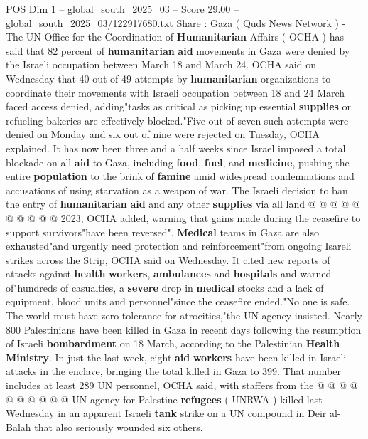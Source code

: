 \begin{textsample}{POS Dim 1 – global\_south\_2025\_03 – Score 29.00 – global\_south\_2025\_03/122917680.txt}  \label{ex:f1_pos_262}
Share : Gaza ( Quds News Network ) - The UN Office for the Coordination of \textbf{Humanitarian} Affairs ( OCHA ) has said that 82 percent of \textbf{humanitarian} \textbf{aid} movements in Gaza were denied by the Israeli occupation between March 18 and March 24.
OCHA said on Wednesday that 40 out of 49 attempts by \textbf{humanitarian} organizations to coordinate their movements with Israeli occupation between 18 and 24 March faced access denied, adding"tasks as critical as picking up essential \textbf{supplies} or refueling bakeries are effectively blocked."Five out of seven such attempts were denied on Monday and six out of nine were rejected on Tuesday, OCHA explained.
It has now been three and a half weeks since Israel imposed a total blockade on all \textbf{aid} to Gaza, including \textbf{food}, \textbf{fuel}, and \textbf{medicine}, pushing the entire \textbf{population} to the brink of \textbf{famine} amid widespread condemnations and accusations of using starvation as a weapon of war.
The Israeli decision to ban the entry of \textbf{humanitarian} \textbf{aid} and any other \textbf{supplies} via all land @ @ @ @ @ @ @ @ @ @ 2023, OCHA added, warning that gains made during the ceasefire to support survivors"have been reversed". \textbf{Medical} teams in Gaza are also exhausted"and urgently need protection and reinforcement"from ongoing Isareli strikes across the Strip, OCHA said on Wednesday.
It cited new reports of attacks against \textbf{health} \textbf{workers}, \textbf{ambulances} and \textbf{hospitals} and warned of"hundreds of casualties, a \textbf{severe} drop in \textbf{medical} stocks and a lack of equipment, blood units and personnel"since the ceasefire ended."No one is safe.
The world must have zero tolerance for atrocities,"the UN agency insisted.
Nearly 800 Palestinians have been killed in Gaza in recent days following the resumption of Israeli \textbf{bombardment} on 18 March, according to the Palestinian \textbf{Health} \textbf{Ministry}.
In just the last week, eight \textbf{aid} \textbf{workers} have been killed in Israeli attacks in the enclave, bringing the total killed in Gaza to 399.
That number includes at least 289 UN personnel, OCHA said, with staffers from the @ @ @ @ @ @ @ @ @ @ UN agency for Palestine \textbf{refugees} ( UNRWA ) killed last Wednesday in an apparent Israeli \textbf{tank} strike on a UN compound in Deir al-Balah that also seriously wounded six others.

\end{textsample}
